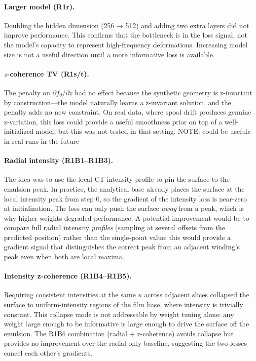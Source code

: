 \documentclass[11pt,a4paper]{article}
\begin{document}
\paragraph{Larger model (R1r).} Doubling the hidden dimension (256 → 512) and adding two extra layers did not improve performance. This confirms that the bottleneck is in the loss signal, not the model's capacity to represent high-frequency deformations. Increasing model size is not a useful direction until a more informative loss is available.

\paragraph{$z$-coherence TV (R1s/t).} The penalty on $\partial f_\theta / \partial z$ had no effect because the synthetic geometry is z-invariant by construction—the model naturally learns a z-invariant solution, and the penalty adds no new constraint. On real data, where spool drift produces genuine z-variation, this loss could provide a useful smoothness prior on top of a well-initialized model, but this was not tested in that setting. NOTE: could be usefule in real runs in the future

\paragraph{Radial intensity (R1B1--R1B3).} The idea was to use the local CT intensity profile to pin the surface to the emulsion peak. In practice, the analytical base already places the surface at the local intensity peak from step 0, so the gradient of the intensity loss is near-zero at initialization. The loss can only push the surface \emph{away} from a peak, which is why higher weights degraded performance. A potential improvement would be to compare full radial intensity \emph{profiles} (sampling at several offsets from the predicted position) rather than the single-point value; this would provide a gradient signal that distinguishes the correct peak from an adjacent winding's peak even when both are local maxima.

\paragraph{Intensity z-coherence (R1B4--R1B5).} Requiring consistent intensities at the same $u$ across adjacent slices collapsed the surface to uniform-intensity regions of the film base, where intensity is trivially constant. This collapse mode is not addressable by weight tuning alone: any weight large enough to be informative is large enough to drive the surface off the emulsion. The R1B6 combination (radial + z-coherence) avoids collapse but provides no improvement over the radial-only baseline, suggesting the two losses cancel each other's gradients.
\end{document}

